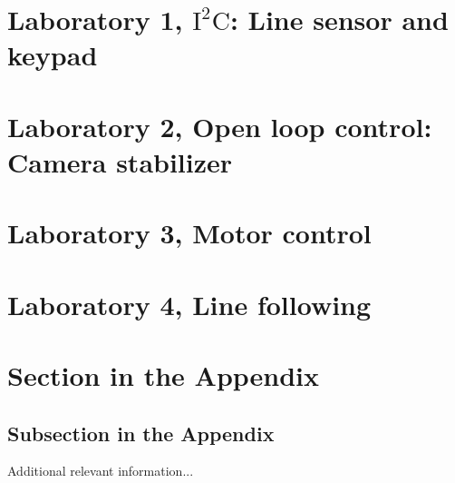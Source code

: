 \documentclass[english]{article}
\begin{document}
\tableofcontents
\newpage

\section{Laboratory 1, $\mathrm{I^2C}$: Line sensor and keypad}
\label{sec:lab1}


\section{Laboratory 2, Open loop control: Camera stabilizer}
\label{sec:lab2}


\section{Laboratory 3, Motor control}
\label{sec:lab3}


\section{Laboratory 4, Line following}
\label{sec:lab4}



\clearpage
\appendix

\section{Section in the Appendix}
\label{sec:app1}

\subsection{Subsection in the Appendix}
\label{subsec:app2}

Additional relevant information...
\end{document}
